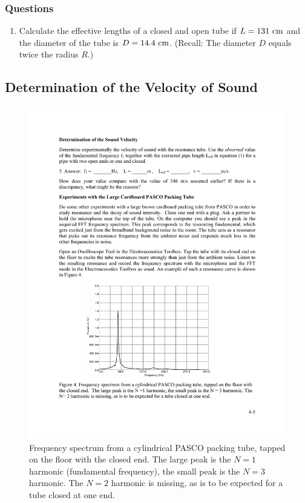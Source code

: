 \documentclass[11pt]{NSF}
\def\ben{\begin{enumerate}}
\def\een{\end{enumerate}}
\def\i{\item{}}
\begin{document}
\subsubsection*{Questions}
\ben
\i Calculate the effective lengths of a closed and open
tube if $L=131~{\rm cm}$ and the diameter of the tube
is $D=14.4~{\rm cm}$.  
(Recall: The diameter  $D$ equals twice the radius $R$.)
\een

\subsection{Determination of the Velocity of Sound}

%
\begin{figure}[hbtp]
\begin{center}
\includegraphics[width=.7\textwidth]{fig4_4}
\caption{Frequency spectrum from a cylindrical PASCO packing tube, 
tapped on the floor with the closed end. 
The large peak is the $N =1$ harmonic (fundamental frequency), 
the small peak is the $N =3$ harmonic. 
The $N =2$ harmonic is missing, as is to be expected for a tube closed at one end.}
\label{f:4} 
\end{center} 
\end{figure}
%
\end{document}
